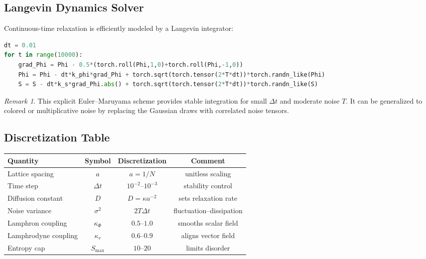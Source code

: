 \documentclass[12pt,a4paper]{article}
\numberwithin{equation}{section}
\theoremstyle{remark}
\newtheorem{remark}{Remark}[section]
\theoremstyle{definition}
\begin{document}
\begin{spacing}{1.12}
\subsection{Langevin Dynamics Solver}\label{sec:G-langevin}
Continuous-time relaxation is efficiently modeled by a Langevin integrator:

\begin{lstlisting}[language=Python,caption={Stochastic Langevin solver for field triplets}]
dt = 0.01
for t in range(10000):
    grad_Phi = Phi - 0.5*(torch.roll(Phi,1,0)+torch.roll(Phi,-1,0))
    Phi = Phi - dt*k_phi*grad_Phi + torch.sqrt(torch.tensor(2*T*dt))*torch.randn_like(Phi)
    S = S - dt*k_s*grad_Phi.abs() + torch.sqrt(torch.tensor(2*T*dt))*torch.randn_like(S)
\end{lstlisting}

\begin{remark}
This explicit Euler–Maruyama scheme provides stable integration for small $\Delta t$ and moderate noise $T$. It can be generalized to colored or multiplicative noise by replacing the Gaussian draws with correlated noise tensors.
\end{remark}

\subsection{Discretization Table}\label{sec:G-table}

\begin{center}
\begin{tabular}{lccc}
\toprule
\textbf{Quantity} & \textbf{Symbol} & \textbf{Discretization} & \textbf{Comment} \\
\midrule
Lattice spacing & $a$ & $a=1/N$ & unitless scaling \\
Time step & $\Delta t$ & $10^{-2}$--$10^{-3}$ & stability control \\
Diffusion constant & $D$ & $D=\kappa a^{-2}$ & sets relaxation rate \\
Noise variance & $\sigma^2$ & $2T\Delta t$ & fluctuation–dissipation \\
Lamphron coupling & $\kappa_\Phi$ & $0.5$–$1.0$ & smooths scalar field \\
Lamphrodyne coupling & $\kappa_v$ & $0.6$–$0.9$ & aligns vector field \\
Entropy cap & $S_{\max}$ & $10$–$20$ & limits disorder \\
\bottomrule
\end{tabular}
\end{center}


\end{spacing}
\end{document}
